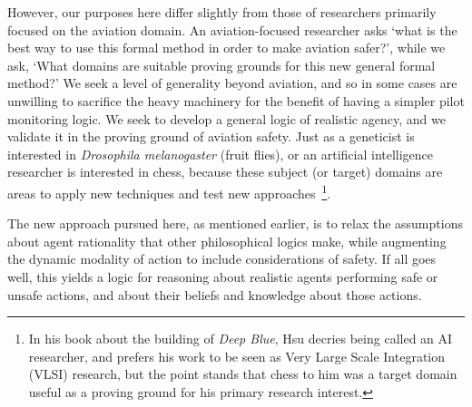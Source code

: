 However, our purposes here differ slightly from those of researchers primarily focused on the aviation domain. An aviation-focused researcher asks `what is the best way to use this formal method in order to make aviation safer?', while we ask, `What domains are suitable proving grounds for this new general formal method?' We seek a level of generality beyond aviation, and so in some cases are unwilling to sacrifice the heavy machinery for the benefit of having a simpler pilot monitoring logic. We seek to develop a general logic of realistic agency, and we validate it in the proving ground of aviation safety. Just as a geneticist is interested in \emph{Drosophila melanogaster} (fruit flies), or an artificial intelligence researcher is interested in chess, because these subject (or target) domains are areas to apply new techniques and test new approaches~\cite{Kohler,Hsu}\footnote{In his book about the building of \emph{Deep Blue}, Hsu decries being called an AI researcher, and prefers his work to be seen as Very Large Scale Integration (VLSI) research, but the point stands that chess to him was a target domain useful as a proving ground for his primary research interest.}. 

The new approach pursued here, as mentioned earlier, is to relax the assumptions about agent rationality that other philosophical logics make, while augmenting the dynamic modality of action to include considerations of safety. If all goes well, this yields a logic for reasoning about realistic agents performing safe or unsafe actions, and about their beliefs and knowledge about those actions.





